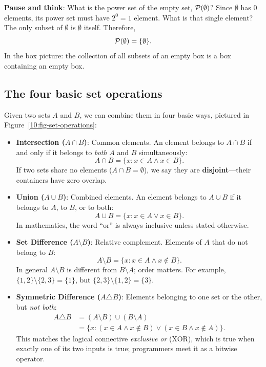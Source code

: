 \begin{recoverybox}
\textbf{Pause and think}: What is the power set of the empty set, $\mathcal{P}(\emptyset)$?
Since $\emptyset$ has $0$ elements, its power set must have $2^0 = 1$ element. What is that single element? The only subset of $\emptyset$ is $\emptyset$ itself. Therefore,
\[
\mathcal{P}(\emptyset) = \{\emptyset\}.
\]
In the box picture: the collection of all subsets of an empty box is a box containing an empty box.
\end{recoverybox}

\subsection{The four basic set operations}

Given two sets $A$ and $B$, we can combine them in four basic ways, pictured in Figure~\ref{10:fig-set-operations}:

\begin{itemize}
\item \textbf{Intersection ($A \cap B$)}: Common elements. An element belongs to $A \cap B$ if and only if it belongs to \emph{both} $A$ and $B$ simultaneously:
\[
A \cap B = \{x : x \in A \land x \in B\}.
\]
If two sets share no elements ($A \cap B = \emptyset$), we say they are \textbf{disjoint}---their containers have zero overlap.

\item \textbf{Union ($A \cup B$)}: Combined elements. An element belongs to $A \cup B$ if it belongs to $A$, to $B$, or to both:
\[
A \cup B = \{x : x \in A \lor x \in B\}.
\]
In mathematics, the word ``or'' is always inclusive unless stated otherwise.

\item \textbf{Set Difference ($A \setminus B$)}: Relative complement. Elements of $A$ that do not belong to $B$:
\[
A \setminus B = \{x : x \in A \land x \notin B\}.
\]
In general $A \setminus B$ is different from $B \setminus A$; order matters. For example, $\{1, 2\} \setminus \{2, 3\} = \{1\}$, but $\{2, 3\} \setminus \{1, 2\} = \{3\}$.

\item \textbf{Symmetric Difference ($A \triangle B$)}: Elements belonging to one set or the other, but \emph{not both}:
\begin{align*}
A \triangle B &= (A \setminus B) \cup (B \setminus A) \\
&= \{x : (x \in A \land x \notin B) \lor (x \in B \land x \notin A)\}.
\end{align*}
This matches the logical connective \emph{exclusive or} (XOR), which is true when exactly one of its two inputs is true; programmers meet it as a bitwise operator.
\end{itemize}

